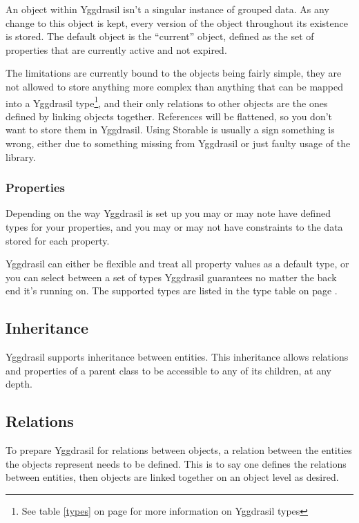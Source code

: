 \documentclass[english,a4paper]{article}
\begin{document}
An object within Yggdrasil isn't a singular instance of grouped data.
As any change to this object is kept, every version of the object
throughout its existence is stored.  The default object is the
``current'' object, defined as the set of properties that are
currently active and not expired.

The limitations are currently bound to the objects being fairly
simple, they are not allowed to store anything more complex than
anything that can be mapped into a Yggdrasil type\footnote{See table
  \ref{types} on page \pageref{types} for more information on
  Yggdrasil types}, and their only relations to other objects are the
ones defined by linking objects together.  References will be
flattened, so you don't want to store them in Yggdrasil.  Using
Storable is usually a sign something is wrong, either due to something
missing from Yggdrasil or just faulty usage of the library.


\subsubsection{Properties}

Depending on the way Yggdrasil is set up you may or may note have
defined types for your properties, and you may or may not have
constraints to the data stored for each property.  

Yggdrasil can either be flexible and treat all property values as a
default type, or you can select between a set of types Yggdrasil
guarantees no matter the back end it's running on.  The supported
types are listed in the type table on page \pageref{types}.
 
\subsection{Inheritance} 

Yggdrasil supports inheritance between entities.  This inheritance
allows relations and properties of a parent class to be accessible to
any of its children, at any depth.

\subsection{Relations}

To prepare Yggdrasil for relations between objects, a relation between
the entities the objects represent needs to be defined.  This is to
say one defines the relations between entities, then objects are
linked together on an object level as desired.
\end{document}
